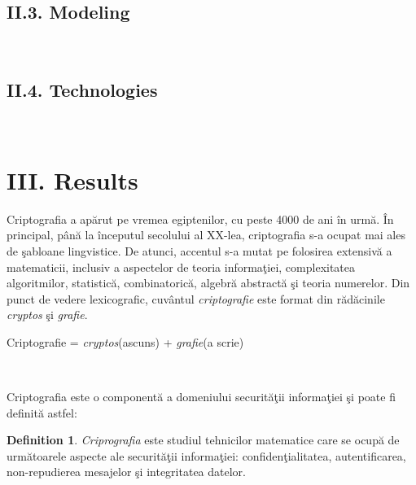 \documentclass[11pt]{report}
\theoremstyle{plain}
\theoremstyle{definition}
\newtheorem{definition}{Definition}
\theoremstyle{definition}
\theoremstyle{proposition}
\begin{document}
\section*{II.3. Modeling}

\

\section*{II.4. Technologies}

\

\newpage

\chapter*{III. Results}


Criptografia a apărut pe vremea egiptenilor, cu peste 4000 de ani în urmă. În principal, până la începutul secolului al XX-lea, criptografia s-a ocupat mai ales de şabloane lingvistice. De atunci, accentul s-a mutat pe folosirea extensivă a matematicii, inclusiv a aspectelor de teoria informaţiei, complexitatea algoritmilor, statistică, combinatorică, algebră abstractă şi teoria numerelor. Din punct de vedere lexicografic, cuvântul \textit{criptografie} este format din rădăcinile \textit{cryptos} şi \textit{grafie}.

\begin{center}
Criptografie = \textit{cryptos}(ascuns) + \textit{grafie}(a scrie)
\end{center}
\

Criptografia este o componentă a domeniului securităţii informaţiei şi poate fi definită astfel:

\begin{definition} \textit{Criprografia} este studiul tehnicilor matematice care se ocupă de următoarele aspecte ale securităţii informaţiei: confidenţialitatea, autentificarea, non-repudierea mesajelor şi integritatea datelor.
\end{definition}
\
\end{document}
